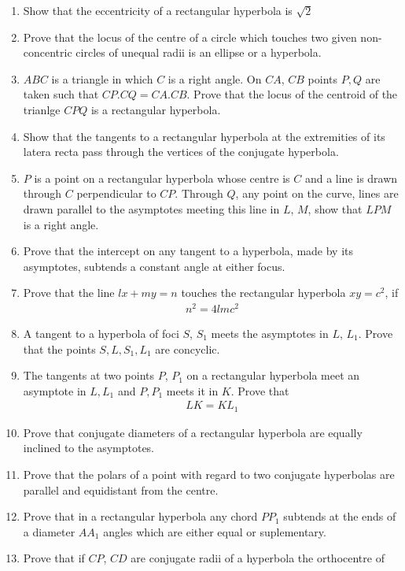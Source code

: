 \begin{enumerate}[1.]
\item Show that the eccentricity of a rectangular hyperbola is $\sqrt{2}$
\item Prove that the locus of the centre of a circle which touches two
given non-concentric circles of unequal radii is an ellipse or a hyperbola.
\item $ABC$ is a triangle in which $C$ is a right angle.  On $CA$, $CB$ points $P, Q$ are
taken such that $CP.CQ=CA.CB$.  Prove that the locus of the centroid of the trianlge $CPQ$ is a rectangular hyperbola.
\item Show that the tangents to a rectangular hyperbola at the extremities of its latera
recta pass through the vertices of the conjugate hyperbola.
\item $P$ is a point on a rectangular hyperbola whose centre is $C$ and a 
line is drawn through $C$ perpendicular to $CP$.  Through
$Q$, any point on the curve, lines are drawn parallel to the asymptotes meeting
this line in $L$, $M$, show that $LPM$ is a right angle.
\item Prove that the intercept on any tangent to a hyperbola, made by its asymptotes, subtends a constant
angle at either focus.
\item Prove that the line $lx+my=n$ touches the rectangular hyperbola $xy=c^2$, if
\begin{align*}
n^2 = 4lmc^2
\end{align*}
\item A tangent to a hyperbola of foci $S$, $S_1$ meets the asymptotes
in $L$, $L_1$.  Prove that the points $S, L, S_1, L_1$ are concyclic.
\item The tangents at two points $P$, $P_1$ on a rectangular hyperbola meet an asymptote in $L, L_1$ and
$P,P_1$ meets it in $K$.  Prove that
\begin{align*}
LK = KL_1
\end{align*}
\item Prove that conjugate diameters of a rectangular hyperbola are equally inclined to the asymptotes.
\item Prove that the polars of a point with regard to two conjugate hyperbolas are parallel and equidistant from the
centre.
\item Prove that in a rectangular hyperbola any chord $PP_1$ subtends at the ends of a diameter $AA_1$ 
angles which are either equal or suplementary.
\item Prove that if $CP$, $CD$ are conjugate radii of a hyperbola the orthocentre of

\end{enumerate}

